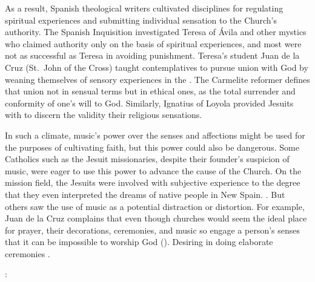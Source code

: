 As a result, Spanish theological writers cultivated disciplines for regulating spiritual experiences and submitting individual sensation to the Church's authority.
The Spanish Inquisition investigated Teresa of Ávila and other mystics who claimed authority only on the basis of spiritual experiences, and most were not as successful as Teresa in avoiding punishment.%
\Autocites{Ahlgren:TeresaPolitics}{Francisca:Inquisition}
Teresa's student Juan de la Cruz (St.\ John of the Cross) taught contemplatives to pursue union with God by weaning themselves of sensory experiences in the .
The Carmelite reformer defines that union not in sensual terms but in ethical ones, as the total surrender and conformity of one's will to God.%
\Autocite[bk.~I, ch.~5--7, 226--248]{JuandelaCruz:Subida}
Similarly, Ignatius of Loyola provided Jesuits with  to discern the validity their religious sensations.%
\Autocite[ch.~6]{Schreiner:Certainty}


In such a climate, music's power over the senses and affections might be used for the purposes of cultivating faith, but this power could also be dangerous.
Some Catholics such as the Jesuit missionaries, despite their founder's suspicion of music, were eager to use this power to advance the cause of the Church.
On the mission field, the Jesuits were involved with subjective experience to the degree that they even interpreted the dreams of native people in New Spain.%
\Autocite[\XXX]{Bailey:Art}.
But others saw the use of music as a potential distraction or distortion.
For example, Juan de la Cruz complains that even though churches would seem the ideal place for prayer, their decorations, ceremonies, and music so engage a person's senses that it can be impossible to worship God  ().%
\Autocite[bk.~3, ch.~39--45, 415--424]{JuandelaCruz:Subida}
Desiring  in doing elaborate ceremonies .%
\begin{Footnote}
  \Autocite[bk.~3, ch.~43, 420]{JuandelaCruz:Subida}: 
\end{Footnote}

